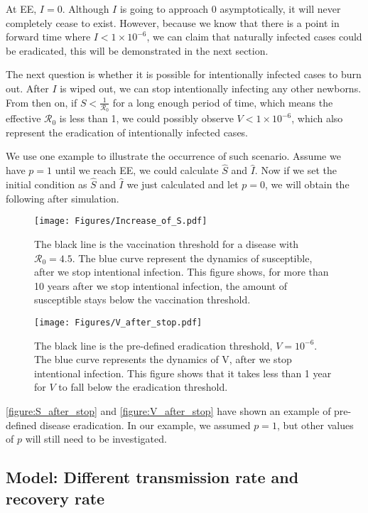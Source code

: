 \documentclass[12pt]{article}
\newcommand{\R}{\mathcal{R}}
\begin{document}
At EE, $I=0$. Although $I$ is going to approach 0 asymptotically, it will never completely cease to exist. However, because we know that there is a point in forward time where $I<1\times10^{-6}$, we can claim that naturally infected cases could be eradicated, this will be demonstrated in the next section.

The next question is whether it is possible for intentionally infected cases to burn out. After $I$ is wiped out, we can stop intentionally infecting any other newborns. From then on, if $S<\frac{1}{\R_0}$ for a long enough period of time, which means the effective $\R_0$ is less than 1, we could possibly observe $V<1\times10^{-6}$, which also represent the eradication of intentionally infected cases.

We use one example to illustrate the occurrence of such scenario. Assume we have $p=1$ until we reach EE, we could calculate $\hat{S}$ and $\hat{I}$. Now if we set the initial condition as $\hat{S}$ and $\hat{I}$ we just calculated and let $p=0$, we will obtain the following after simulation.
\begin{figure}[H]
  \centering
  \texttt{[image: Figures/Increase\_of\_S.pdf]}
  \caption{The black line is the vaccination threshold for a disease with $\R_0=4.5$. The blue curve represent the dynamics of susceptible, after we stop intentional infection. This figure shows, for more than 10 years after we stop intentional infection, the amount of susceptible stays below the vaccination threshold.}
\label{figure:S_after_stop}
\end{figure}

\begin{figure}[H]
  \centering
  \texttt{[image: Figures/V\_after\_stop.pdf]}
  \caption{The black line is the pre-defined eradication threshold, $V=10^{-6}$. The blue curve represents the dynamics of V, after we stop intentional infection. This figure shows that it takes less than 1 year for $V$ to fall below the eradication threshold.}
\label{figure:V_after_stop}
\end{figure}

\autoref{figure:S_after_stop} and \autoref{figure:V_after_stop} have shown an example of pre-defined disease eradication. In our example, we assumed $p=1$, but other values of $p$ will still need to be investigated.

\subsection{Model: Different transmission rate and recovery rate}
\end{document}
